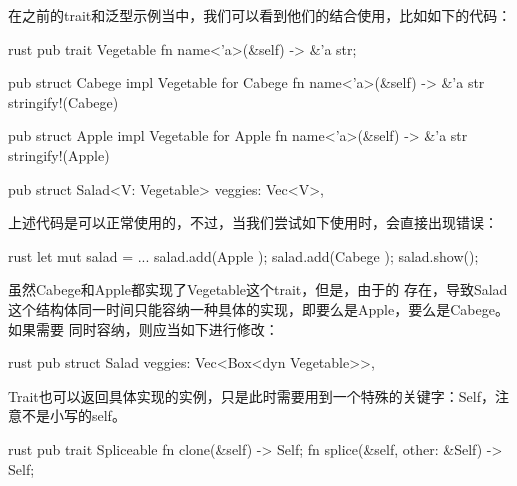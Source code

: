 在之前的trait和泛型示例当中，我们可以看到他们的结合使用，比如如下的代码：
\begin{code-block}{rust}
pub trait Vegetable {
    fn name<'a>(&self) -> &'a str;
}

pub struct Cabege {}
impl Vegetable for Cabege {
    fn name<'a>(&self) -> &'a str {
        stringify!(Cabege)
    }
}

pub struct Apple {}
impl Vegetable for Apple {
    fn name<'a>(&self) -> &'a str {
        stringify!(Apple)
    }
}

pub struct Salad<V: Vegetable> {
    veggies: Vec<V>,
}
\end{code-block}

上述代码是可以正常使用的，不过，当我们尝试如下使用时，会直接出现错误：
\begin{code-block}{rust}
let mut salad = ...
salad.add(Apple {});
salad.add(Cabege {});
salad.show();
\end{code-block}
虽然Cabege和Apple都实现了Vegetable这个trait，但是，由于的
存在，导致Salad这个结构体同一时间只能容纳一种具体的实现，即要么是Apple，要么是Cabege。如果需要
同时容纳，则应当如下进行修改：
\begin{code-block}{rust}
pub struct Salad{
    veggies: Vec<Box<dyn Vegetable>>,
}
\end{code-block}

Trait也可以返回具体实现的实例，只是此时需要用到一个特殊的关键字：Self，注意不是小写的self。
\begin{code-block}{rust}
pub trait Spliceable {
    fn clone(&self) -> Self;
    fn splice(&self, other: &Self) -> Self;
}
\end{code-block}

